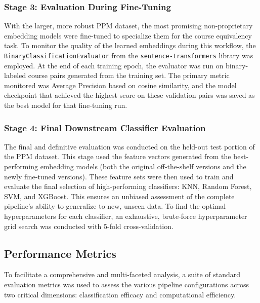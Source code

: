 \subsubsection{Stage 3: Evaluation During Fine-Tuning}\label{ch:3.4.1.2}
With the larger, more robust PPM dataset, the most promising non-proprietary embedding models were fine-tuned to specialize them for the course equivalency task. To monitor the quality of the learned embeddings during this workflow, the \verb|BinaryClassificationEvaluator| from the \verb|sentence-transformers| library was employed. At the end of each training epoch, the evaluator was run on binary-labeled course pairs generated from the training set. The primary metric monitored was Average Precision based on cosine similarity, and the model checkpoint that achieved the highest score on these validation pairs was saved as the best model for that fine-tuning run.{\setlength{\emergencystretch}{5em}\par}

\subsubsection{Stage 4: Final Downstream Classifier Evaluation}\label{ch:3.4.1.3}
The final and definitive evaluation was conducted on the held-out test portion of the PPM dataset. This stage used the feature vectors generated from the best-performing embedding models (both the original off-the-shelf versions and the newly fine-tuned versions). These feature sets were then used to train and evaluate the final selection of high-performing classifiers: KNN, Random Forest, SVM, and XGBoost. This ensures an unbiased assessment of the complete pipeline's ability to generalize to new, unseen data. To find the optimal hyperparameters for each classifier, an exhaustive, brute-force hyperparameter grid search was conducted with 5-fold cross-validation.

\subsection{Performance Metrics}\label{ch:3.4.2}
To facilitate a comprehensive and multi-faceted analysis, a suite of standard evaluation metrics was used to assess the various pipeline configurations across two critical dimensions: classification efficacy and computational efficiency.

